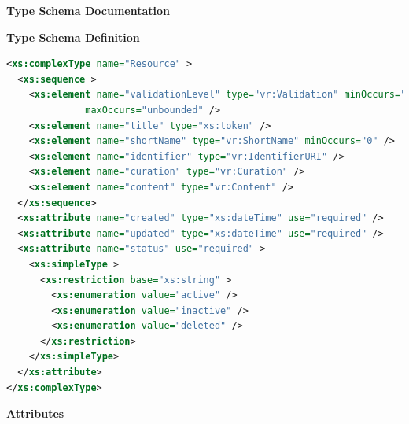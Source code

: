 \documentclass[11pt,a4paper]{ivoa}
\begin{document}
\begingroup
      	\renewcommand*\descriptionlabel[1]{%
      	\hbox to 5.5em{\emph{#1}\hfil}}\vspace{2ex}\noindent\textbf{ Type Schema Documentation}


\vspace{1ex}\noindent\textbf{ Type Schema Definition}

\begin{lstlisting}[language=XML,basicstyle=\footnotesize]
<xs:complexType name="Resource" >
  <xs:sequence >
    <xs:element name="validationLevel" type="vr:Validation" minOccurs="0"
              maxOccurs="unbounded" />
    <xs:element name="title" type="xs:token" />
    <xs:element name="shortName" type="vr:ShortName" minOccurs="0" />
    <xs:element name="identifier" type="vr:IdentifierURI" />
    <xs:element name="curation" type="vr:Curation" />
    <xs:element name="content" type="vr:Content" />
  </xs:sequence>
  <xs:attribute name="created" type="xs:dateTime" use="required" />
  <xs:attribute name="updated" type="xs:dateTime" use="required" />
  <xs:attribute name="status" use="required" >
    <xs:simpleType >
      <xs:restriction base="xs:string" >
        <xs:enumeration value="active" />
        <xs:enumeration value="inactive" />
        <xs:enumeration value="deleted" />
      </xs:restriction>
    </xs:simpleType>
  </xs:attribute>
</xs:complexType>
\end{lstlisting}

\vspace{0.5ex}\noindent\textbf{ Attributes}
\end{document}
